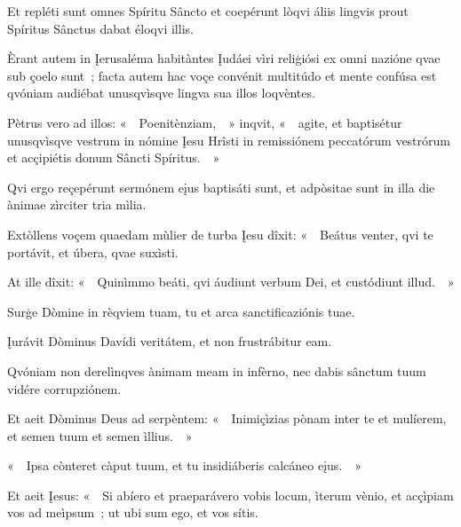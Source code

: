 Et repléti sunt omnes Spíritu Sâncto et coepérunt lòqvi áliis lingvis prout Spíritus Sânctus dabat éloqvi illis. 

Èrant autem in Įerusaléma habitàntes Įudáei vìri reliģiósi ex omni nazióne qvae sub çoelo sunt~; facta autem hac voçe convénit multitúdo et mente confúsa est qvóniam audiébat unusqvìsqve lingva sua illos loqvèntes. 

Pètrus vero ad illos: «~~Poenitènziam,~~» inqvit, «~~agite, et baptisétur unusqvìsqve vestrum in nómine Įesu Hrîsti in remissiónem peccatórum vestrórum et acçipiétis donum Sâncti Spíritus.~~» 

Qvi ergo reçepérunt sermónem eįus baptisáti sunt, et adpòsitae sunt in illa die ànimae zìrciter tria mìlia. 


Extòllens voçem quaedam mùlier de turba Įesu dîxit: «~~Beátus venter, qvi te portávit, et úbera, qvae suxìsti. 

At ille dîxit: «~~Quinìmmo beáti, qvi áudiunt verbum Dei, et custódiunt illud.~~» 

Surģe Dòmine in rèqviem tuam, tu et arca sanctificaziónis tuae. 

Įurávit Dòminus Davídi veritátem, et non frustrábitur eam. 

Qvóniam non derelìnqves ànimam meam in infèrno, nec dabis sânctum tuum vidére corrupziónem. 

Et aeit Dòminus Deus ad serpèntem: «~~Inimiçìzias pònam inter te et mulíerem, et semen tuum et semen ìllius.~~» 

«~~Ipsa cònteret càput tuum, et tu insidiáberis calcáneo eįus.~~» 

Et aeit Įesus: «~~Si abíero et praeparávero vobis locum, ìterum vènio, et acçìpiam vos ad meìpsum~; ut ubi sum ego, et vos sítis. 

